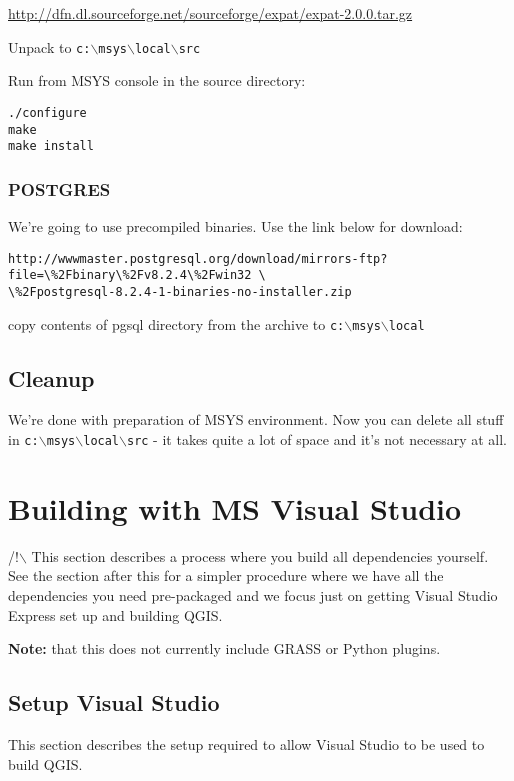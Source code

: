 \url{http://dfn.dl.sourceforge.net/sourceforge/expat/expat-2.0.0.tar.gz}

Unpack to \texttt{c:$\backslash$msys$\backslash$local$\backslash$src}

Run from MSYS console in the source directory:

\begin{verbatim}
./configure
make
make install
\end{verbatim}

\subsubsection{POSTGRES}
We're going to use precompiled binaries. Use the link below for download:

\begin{verbatim}
http://wwwmaster.postgresql.org/download/mirrors-ftp?file=\%2Fbinary\%2Fv8.2.4\%2Fwin32 \
\%2Fpostgresql-8.2.4-1-binaries-no-installer.zip
\end{verbatim}

copy contents of pgsql directory from the archive to \texttt{c:$\backslash$msys$\backslash$local}

\subsection{Cleanup}
We're done with preparation of MSYS environment. Now you can delete all stuff in \texttt{c:$\backslash$msys$\backslash$local$\backslash$src} - it takes quite a lot
of space and it's not necessary at all.


\section{Building with MS Visual Studio}
/!$\backslash$ This section describes a process where you build all dependencies yourself. See the section
after this for a simpler procedure where we have all the dependencies you need pre-packaged
and we focus just on getting Visual Studio Express set up and building QGIS.

\textbf{Note:} that this does not currently include GRASS or Python plugins.

\subsection{Setup Visual Studio}
This section describes the setup required to allow Visual Studio to be used to build QGIS. 

